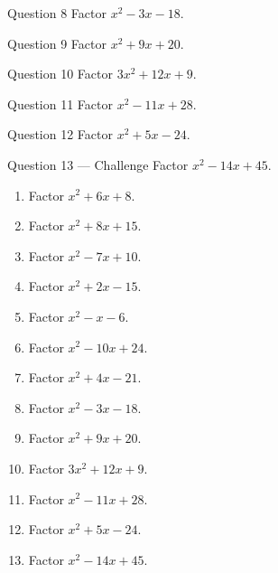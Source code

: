 \documentclass[11pt]{article}
\begin{document}
\begin{qbox}{Question 8}
Factor $x^2-3x-18$.\workspace{1.8cm}
\end{qbox}

\begin{qbox}{Question 9}
Factor $x^2+9x+20$.\workspace{1.8cm}
\end{qbox}

\begin{qbox}{Question 10}
Factor $3x^2+12x+9$.\workspace{2.0cm}
\end{qbox}

\begin{qbox}{Question 11}
Factor $x^2-11x+28$.\workspace{1.8cm}
\end{qbox}

\begin{qbox}{Question 12}
Factor $x^2+5x-24$.\workspace{1.8cm}
\end{qbox}

\begin{qbox}{Question 13 --- Challenge}
Factor $x^2-14x+45$.\workspace{2.0cm}
\end{qbox}

\clearpage
{}

\begin{recapbox}
\begin{multicols}{2}
\small
\begin{enumerate}[leftmargin=*,itemsep=3pt]
  \item Factor $x^2+6x+8$.
  \item Factor $x^2+8x+15$.
  \item Factor $x^2-7x+10$.
  \item Factor $x^2+2x-15$.
  \item Factor $x^2-x-6$.
  \item Factor $x^2-10x+24$.
  \item Factor $x^2+4x-21$.
  \item Factor $x^2-3x-18$.
  \item Factor $x^2+9x+20$.
  \item Factor $3x^2+12x+9$.
  \item Factor $x^2-11x+28$.
  \item Factor $x^2+5x-24$.
  \item Factor $x^2-14x+45$.
\end{enumerate}
\end{multicols}
\end{recapbox}
\end{document}
